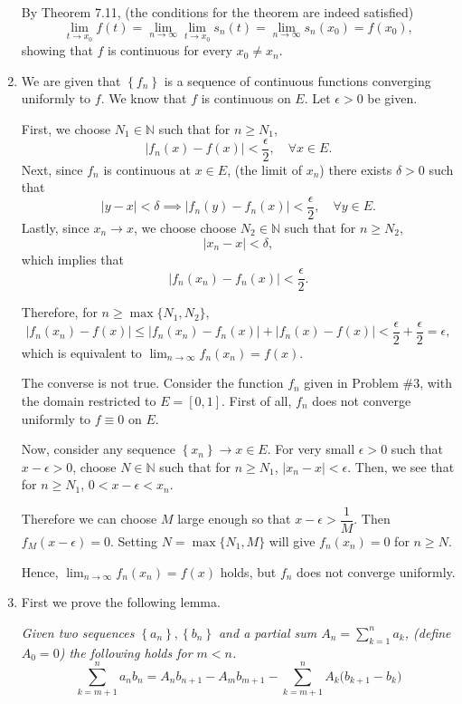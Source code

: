 \documentclass[12pt]{report}
\newcommand{\numl}[1]{\item[\large\textbf{\sffamily #1.}]}
\newcommand{\ds}{\displaystyle}
\newcommand{\abs}[1]{\left| #1 \right|}
\newcommand{\seq}[1]{\left\{ #1 \right\}}
\newcommand{\ra}{\rightarrow}
\newcommand{\N}{\mathbb{N}}
\begin{document}
\begin{enumerate}
    By {\sffamily Theorem 7.11}, (the conditions for the theorem are indeed satisfied)
    \[
        \lim_{t \ra x_0} f(t) = \lim_{n\ra\infty} \lim_{t \ra x_0} s_n(t) = \lim_{n\ra\infty} s_n(x_0) = f(x_0),
    \]
    showing that \(f\) is continuous for every \(x_0 \neq x_n\).

    \numl{7} We are given that \(\seq{f_n}\) is a sequence of continuous functions converging uniformly to \(f\). We know that \(f\) is continuous on \(E\). Let \(\epsilon > 0\) be given.

    First, we choose \(N_1 \in \N\) such that for \(n \geq N_1\),
    \[
        \abs{f_n(x) - f(x)} < \frac{\epsilon}{2}, \quad \forall x \in E.
    \]
    Next, since \(f_n\) is continuous at \(x \in E\), (the limit of \(x_n\)) there exists \(\delta > 0\) such that
    \[
        \abs{y - x} < \delta \implies \abs{f_n(y) - f_n(x)} < \frac{\epsilon}{2}, \quad \forall y\in E.
    \]
    Lastly, since \(x_n \ra x\), we choose choose \(N_2 \in \N\) such that for \(n \geq N_2\),
    \[
        \abs{x_n - x} < \delta,
    \]
    which implies that
    \[
        \abs{f_n(x_n) - f_n(x)} < \frac{\epsilon}{2}.
    \]

    Therefore, for \(n \geq \max\{N_1, N_2\}\),
    \[
        \abs{f_n(x_n) - f(x)} \leq \abs{f_n(x_n) - f_n(x)} + \abs{f_n(x) - f(x)} < \frac{\epsilon}{2} + \frac{\epsilon}{2} = \epsilon,
    \]
    which is equivalent to \(\ds \lim_{n\ra\infty} f_n(x_n) = f(x)\).

    The converse is not true. Consider the function \(f_n\) given in {\sffamily Problem \#3}, with the domain restricted to \(E = [0, 1]\). First of all, \(f_n\) does not converge uniformly to \(f \equiv 0\) on \(E\).

    Now, consider any sequence \(\seq{x_n} \ra x \in E\). For very small \(\epsilon > 0\) such that \(x - \epsilon > 0\), choose \(N \in \N\) such that for \(n \geq N_1\), \(\abs{x_n - x} < \epsilon\). Then, we see that for \(n \geq N_1\), \(0 < x - \epsilon < x_n\).

    Therefore we can choose \(M\) large enough so that \(x - \epsilon > \dfrac{1}{M}\). Then \(f_M(x - \epsilon) = 0\). Setting \(N = \max\{N_1, M\}\) will give \(f_n(x_n) = 0\) for \(n \geq N\).

    Hence, \(\ds \lim_{n\ra\infty} f_n(x_n) = f(x)\) holds, but \(f_n\) does not converge uniformly.


    \numl{8} First we prove the following lemma.

     \textit{Given two sequences \(\seq{a_n}, \seq{b_n}\) and a partial sum \(A_n = \ds\sum_{k=1}^n a_k\), (define \(A_0 = 0\)) the following holds for \(m < n\).
        \begin{equation} \tag{\textasteriskcentered}
            \sum_{k=m+1}^n a_n b_n = A_n b_{n+1} - A_m b_{m+1} - \sum_{k=m+1}^n A_k \bigl(b_{k+1} - b_k\bigr)
        \end{equation}
    }


\end{enumerate}
\end{document}
